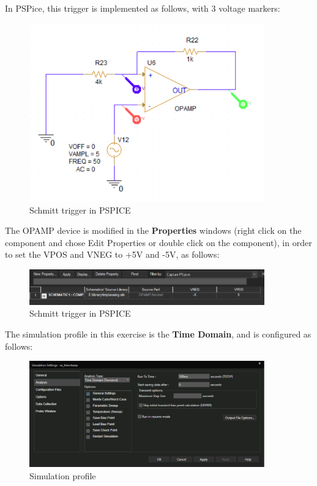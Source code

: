 In PSPice, this trigger is implemented as follows, with 3 voltage markers:

\begin{figure}[!htp]
    \centering
    \includegraphics[width = 4in]{source/picture/bai_5/sTrigger2.png}
    \caption{Schmitt trigger in PSPICE}
    \label{lab05_low_filter5}
\end{figure}

The OPAMP device is modified in the \textbf{Properties} windows (right click on the component and chose Edit Properties or double click on the component), in order to set the VPOS and VNEG to +5V and -5V, as follows:

\begin{figure}[!htp]
    \centering
    \includegraphics[width = 4in]{source/picture/bai_5/sTrigger4.png}
    \caption{Schmitt trigger in PSPICE}
    \label{lab05_low_filter5}
\end{figure}


The simulation profile in this exercise is the \textbf{Time Domain}, and is configured as follows:

\begin{figure}[!htp]
    \centering
    \includegraphics[width = 4in]{source/picture/bai_5/sTrigger3.png}
    \caption{Simulation profile}
    \label{lab05_low_filter5}
\end{figure}

